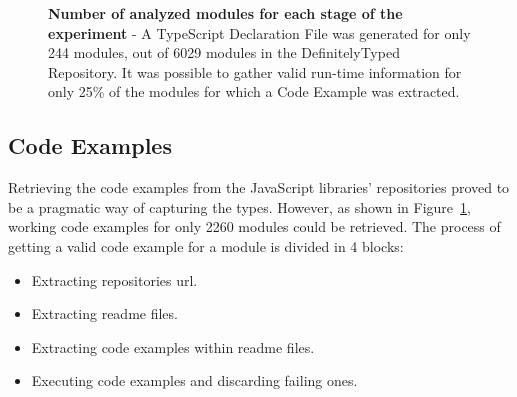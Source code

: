 \documentclass[a4paper,english,cleveref, autoref]{lipics-v2019}
\newcommand{\figref}[1]{Figure~\ref{#1}}
\begin{document}
\begin{figure}[tp]
	\hspace*{-0.16\textwidth}
	\centering
	\caption[Number of analyzed modules for each stage of the experiment]{\textbf{Number of analyzed modules for each stage of the experiment} - A TypeScript Declaration File was generated for only 244 modules, out of 6029 modules in the DefinitelyTyped Repository. It was possible to gather valid run-time information for only 25\% of the modules for which a Code Example was extracted.}
	\label{fig:experiments-overall-funnel}
\end{figure}

\subsection{Code Examples}
Retrieving the code examples from the JavaScript libraries' repositories proved to be a pragmatic way of capturing the types. However, as shown in \figref{fig:experiments-overall-funnel}, working code examples for only 2260 modules could be retrieved. The process of getting a valid code example for a module is divided in 4 blocks:
\begin{itemize}
	\item Extracting repositories url.
	\item Extracting readme files.
	\item Extracting code examples within readme files.
	\item Executing code examples and discarding failing ones.
\end{itemize}
\end{document}
